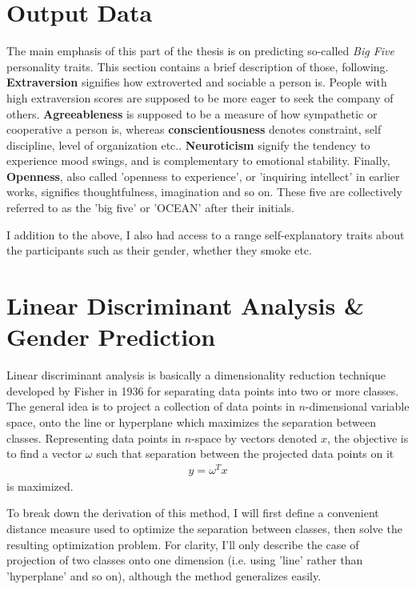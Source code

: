 \section{Output Data}
\label{sec:output_data}
The main emphasis of this part of the thesis is on predicting so-called \textit{Big Five} personality traits. This section contains a brief description of those, following\cite{Digman1990}.
\textbf{Extraversion} signifies how extroverted and sociable a person is. People with high extraversion scores are supposed to be more eager to seek the company of others. \textbf{Agreeableness} is supposed to be a measure of how sympathetic or cooperative a person is, whereas \textbf{conscientiousness} denotes constraint, self discipline, level of organization etc.. \textbf{Neuroticism} signify the tendency to experience mood swings, and is complementary to emotional stability. Finally, \textbf{Openness}, also called 'openness to experience', or 'inquiring intellect' in earlier works, signifies thoughtfulness, imagination and so on. These five are collectively referred to as the 'big five' or 'OCEAN' after their initials.

I addition to the above, I also had access to a range self-explanatory traits about the participants such as their gender, whether they smoke etc.

\section[Linear Discriminant Analysis]{Linear Discriminant Analysis \& Gender Prediction}
\label{sec:LDA}
Linear discriminant analysis is basically a dimensionality reduction technique developed by Fisher in 1936 \cite{fisher_original} for separating data points into two or more classes. The general idea is to project a collection of data points in $n$-dimensional variable space, onto the line or hyperplane which maximizes the separation between classes. Representing data points in $n$-space by vectors denoted $x$, the objective is to find a vector $\omega$ such that separation between the projected data points on it
\begin{align}
	y = \omega^T x
\end{align}
is maximized.

To break down the derivation of this method, I will first define a convenient distance measure used to optimize the separation between classes, then solve the resulting optimization problem. For clarity, I'll only describe the case of projection of two classes onto one dimension (i.e. using 'line' rather than 'hyperplane' and so on), although the method generalizes easily.

